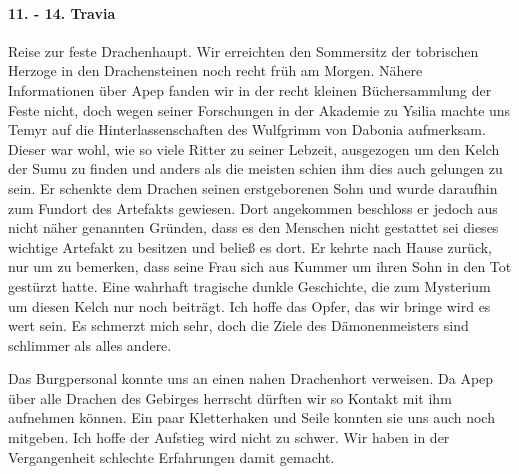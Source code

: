 \paragraph{11. - 14. Travia}
Reise zur feste Drachenhaupt. Wir erreichten den Sommersitz der tobrischen Herzoge in den Drachensteinen noch recht früh am Morgen. Nähere Informationen über Apep fanden wir in der recht kleinen Büchersammlung der Feste nicht, doch wegen seiner Forschungen in der Akademie zu Ysilia machte uns Temyr auf die Hinterlassenschaften des Wulfgrimm von Dabonia aufmerksam. Dieser war wohl, wie so viele Ritter zu seiner Lebzeit, ausgezogen um den Kelch der Sumu zu finden und anders als die meisten schien ihm dies auch gelungen zu sein. Er schenkte dem Drachen seinen erstgeborenen Sohn und wurde daraufhin zum Fundort des Artefakts gewiesen. Dort angekommen beschloss er jedoch aus nicht näher genannten Gründen, dass es den Menschen nicht gestattet sei dieses wichtige Artefakt zu besitzen und beließ es dort. Er kehrte nach Hause zurück, nur um zu bemerken, dass seine Frau sich aus Kummer um ihren Sohn in den Tot gestürzt hatte. Eine wahrhaft tragische dunkle Geschichte, die zum Mysterium um diesen Kelch nur noch beiträgt. Ich hoffe das Opfer, das wir bringe wird es wert sein. Es schmerzt mich sehr, doch die Ziele des Dämonenmeisters sind schlimmer als alles andere.

Das Burgpersonal konnte uns an einen nahen Drachenhort verweisen. Da Apep über alle Drachen des Gebirges herrscht dürften wir so Kontakt mit ihm aufnehmen können. Ein paar Kletterhaken und Seile konnten sie uns auch noch mitgeben. Ich hoffe der Aufstieg wird nicht zu schwer. Wir haben in der Vergangenheit schlechte Erfahrungen damit gemacht.

